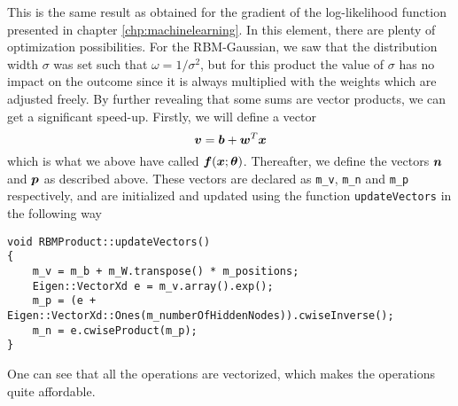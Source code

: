 This is the same result as obtained for the gradient of the log-likelihood function presented in chapter \ref{chp:machinelearning}. In this element, there are plenty of optimization possibilities. For the RBM-Gaussian, we saw that the distribution width $\sigma$ was set such that $\omega=1/\sigma^2$, but for this product the value of $\sigma$ has no impact on the outcome since it is always multiplied with the weights which are adjusted freely. By further revealing that some sums are vector products, we can get a significant speed-up. Firstly, we will define a vector 
\begin{equation}
\boldsymbol{{v}}=\boldsymbol{{b}}+\boldsymbol{{w}}^T\boldsymbol{{x}}
\end{equation}
which is what we above have called $\boldsymbol{{f}}(\boldsymbol{{x}};\boldsymbol{{\theta}})$. Thereafter, we define the vectors $\boldsymbol{{n}}$ and $\boldsymbol{{p}}$ as described above. These vectors are declared as \lstinline|m_v|, \lstinline|m_n| and \lstinline|m_p| respectively, and are initialized and updated using the function \lstinline|updateVectors| in the following way

\begin{lstlisting}
void RBMProduct::updateVectors()
{
	m_v = m_b + m_W.transpose() * m_positions;
	Eigen::VectorXd e = m_v.array().exp();
	m_p = (e + Eigen::VectorXd::Ones(m_numberOfHiddenNodes)).cwiseInverse();
	m_n = e.cwiseProduct(m_p);
}
\end{lstlisting}
One can see that all the operations are vectorized, which makes the operations quite affordable. 

